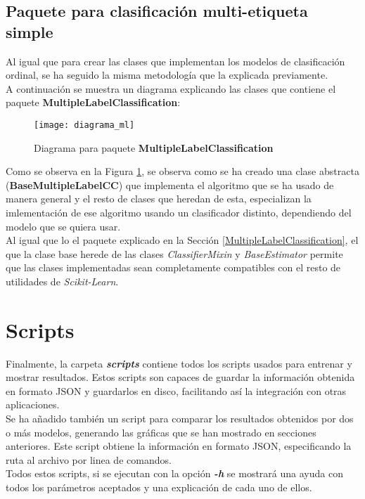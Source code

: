 \subsection{Paquete para clasificación multi-etiqueta simple}
\label{sec:sftw-mlc}
Al igual que para crear las clases que implementan los modelos de clasificación ordinal, se ha seguido la misma metodología que la explicada previamente.\\
A continuación se muestra un diagrama explicando las clases que contiene el paquete \textbf{MultipleLabelClassification}:
\begin{figure}[H]
	\centering
	\texttt{[image: diagrama\_ml]}
	\caption{Diagrama para paquete \textbf{MultipleLabelClassification}}
	\label{dig:paquetes_ml}
\end{figure}
Como se observa en la Figura \ref{dig:paquetes_ml}, se observa como se ha creado una clase abstracta (\textbf{BaseMultipleLabelCC}) que implementa el algoritmo que se ha usado de manera general y el resto de clases que heredan de esta, especializan la imlementación de ese algoritmo usando un clasificador distinto, dependiendo del modelo que se quiera usar.\\
\linebreak
Al igual que lo el paquete explicado en la Sección \ref{MultipleLabelClassification}, el que la clase base herede de las clases \textit{ClassifierMixin} y \textit{BaseEstimator} permite que las clases implementadas sean completamente compatibles con el resto de utilidades de \textit{Scikit-Learn}.
\section{Scripts}
Finalmente, la carpeta \textbf{\textit{scripts}} contiene todos los scripts usados para entrenar y mostrar resultados. Estos scripts son capaces de guardar la información obtenida en formato JSON y guardarlos en disco, facilitando así la integración con otras aplicaciones.\\
\linebreak
Se ha añadido también un script para comparar los resultados obtenidos por dos o más modelos, generando las gráficas que se han mostrado en secciones anteriores. Este script obtiene la información en formato JSON, especificando la ruta al archivo por linea de comandos. \\
\linebreak
Todos estos scripts, si se ejecutan con la opción \textbf{\textit{-h}} se mostrará una ayuda con todos los parámetros aceptados y una explicación de cada uno de ellos.
